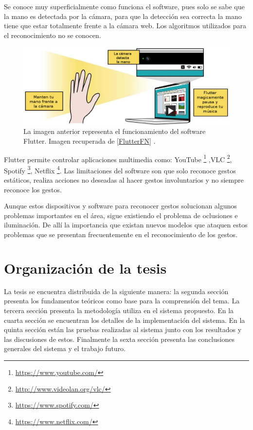 Se conoce muy superficialmente como funciona el software, pues solo se sabe que la mano es detectada por la cámara, para que la detección sea correcta la mano tiene que estar totalmente frente a la cámara web. Los algoritmos utilizados para el reconocimiento no se conocen.  
\begin{figure}[h!]
\begin{center}
\includegraphics[scale=.4]{./Figures/Flutter.jpg}
\end{center}
\caption{La imagen anterior representa el funcionamiento del software Flutter. Imagen recuperada de \ref{FlutterFN} .}
\label{fig:Flutter}
\end{figure}

Flutter permite controlar aplicaciones multimedia como: YouTube \footnote{\url{https://www.youtube.com/}} ,VLC \footnote{\url{http://www.videolan.org/vlc/}}, Spotify \footnote{\url{https://www.spotify.com/}}, Netflix \footnote{\url{https://www.netflix.com/}}. Las limitaciones del software son que solo reconoce gestos estáticos, realiza acciones no deseadas al hacer gestos involuntarios y no siempre reconoce los gestos.  


Aunque estos dispositivos y software para reconocer gestos solucionan algunos problemas importantes en el área, sigue existiendo el problema de oclusiones e iluminación.
De allí la importancia que existan nuevos modelos que ataquen estos problemas que se presentan frecuentemente en el reconocimiento de los gestos.
  
\section{Organizaci\'on de la tesis}\label{OrganizacionTesis}

La tesis se encuentra distribuida de la siguiente manera: la segunda sección presenta los fundamentos teóricos como base para la comprensión del tema. La tercera sección presenta la metodología utiliza en el sistema propuesto. En la cuarta sección se encuentran los detalles de la implementación del sistema. En la quinta sección están las pruebas realizadas al sistema junto con los resultados y las discusiones de estos. Finalmente la sexta sección presenta las conclusiones generales del sistema y el trabajo futuro. 

